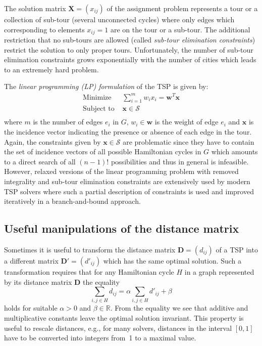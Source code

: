 \documentclass[10pt,a4paper,fleqn]{article}
\begin{document}
The solution matrix $\mathbf{X} = (x_{ij})$ of the assignment problem
represents a tour or a collection of sub-tour (several unconnected cycles) where
only edges which corresponding to elements $x_{ij} = 1$ are on the tour or a
sub-tour. The additional restriction that no sub-tours are allowed (called
\emph{sub-tour elimination constraints}) restrict the solution to only proper
tours. Unfortunately, the number of sub-tour elimination constraints grows
exponentially with the number of cities which leads to an extremely hard
problem.

The \emph{linear programming (LP) formulation} of the TSP is given by:
\[
\begin{array}{rl}
    \text{Minimize }     & \sum_{i=1}^m{w_ix_i}  = \mathbf{w}^T\mathbf{x}\\[3mm] 
    \text{Subject to }   & \mathbf{x} \in \mathcal{S} \\
\end{array}
\]
where $m$ is the number of edges $e_i$ in $G$, $w_i \in \mathbf{w}$ is the
weight of edge $e_i$ and $\mathbf{x}$ is the incidence vector indicating the
presence or absence of each edge in the tour. Again, the constraints given by
$\mathbf{x} \in \mathcal{S}$ are problematic since they have to contain the set
of incidence vectors of all possible Hamiltonian cycles in $G$ which amounts to
a direct search of all $(n-1)!$ possibilities and thus in general is
infeasible. However, relaxed versions of the linear programming problem with
removed integrality and sub-tour elimination constraints are extensively used by
modern TSP solvers where such a partial description of constraints is used and
improved iteratively in a branch-and-bound approach.

\subsection{Useful manipulations of the distance matrix}
\label{sec:manipulations}

Sometimes it is useful to transform the distance matrix $\mathbf{D} = (d_{ij})$
of a TSP into a different matrix $\mathbf{D'} = (d'_{ij})$ which has the same
optimal solution.  Such a transformation requires that for any
Hamiltonian cycle $H$ in a graph represented by its distance matrix $\mathbf{D}$
the equality
\begin{equation*}
\sum_{i,j \in H}{d_{ij}} = \alpha \sum_{i,j \in H}{d'_{ij}} + \beta
\end{equation*}
holds for suitable $\alpha > 0$ and $\beta \in \mathbb{R}$.  From the
equality we see that additive and multiplicative constants leave the
optimal solution invariant. This property is useful to rescale
distances, e.g., for many solvers, distances in the interval $[0, 1]$
have to be converted into integers from~1 to a maximal value.
\end{document}
